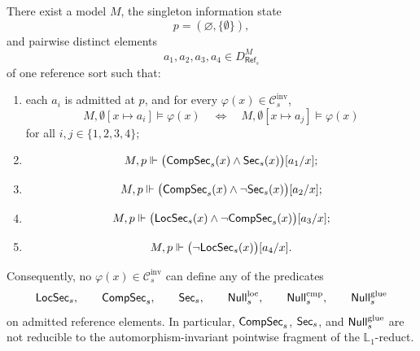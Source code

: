 \begin{proposition}\label{thm:pointwise-irreducibility}
There exist a model $M$, the singleton information state
\[
p=(\varnothing,\{\emptyset\}),
\]
and pairwise distinct elements
\[
a_1,a_2,a_3,a_4\in D_{\mathsf{Ref}_s}^M
\]
of one reference sort such that:
\begin{enumerate}[label=(\roman*),nosep]
\item each $a_i$ is admitted at $p$, and for every $\varphi(x)\in\mathcal{C}_{s}^{\mathrm{inv}}$,
\[
M,\emptyset[x\mapsto a_i]\models\varphi(x)
\quad\Longleftrightarrow\quad
M,\emptyset[x\mapsto a_j]\models\varphi(x)
\]
for all $i,j\in\{1,2,3,4\}$;
\item
\[
M,p\Vdash \bigl(\mathsf{CompSec}_s(x)\land \mathsf{Sec}_s(x)\bigr)[a_1/x];
\]
\item
\[
M,p\Vdash \bigl(\mathsf{CompSec}_s(x)\land \neg\mathsf{Sec}_s(x)\bigr)[a_2/x];
\]
\item
\[
M,p\Vdash \bigl(\mathsf{LocSec}_s(x)\land \neg\mathsf{CompSec}_s(x)\bigr)[a_3/x];
\]
\item
\[
M,p\Vdash \bigl(\neg\mathsf{LocSec}_s(x)\bigr)[a_4/x].
\]
\end{enumerate}
Consequently, no $\varphi(x)\in\mathcal{C}_{s}^{\mathrm{inv}}$ can define any of the predicates
\[
\mathsf{LocSec}_s,
\qquad
\mathsf{CompSec}_s,
\qquad
\mathsf{Sec}_s,
\qquad
\mathsf{Null}^{\mathrm{loc}}_s,
\qquad
\mathsf{Null}^{\mathrm{cmp}}_s,
\qquad
\mathsf{Null}^{\mathrm{glue}}_s
\]
on admitted reference elements. In particular, $\mathsf{CompSec}_s$, $\mathsf{Sec}_s$, and $\mathsf{Null}^{\mathrm{glue}}_s$ are not reducible to the automorphism-invariant pointwise fragment of the $\mathbb L_1$-reduct.
\end{proposition}

